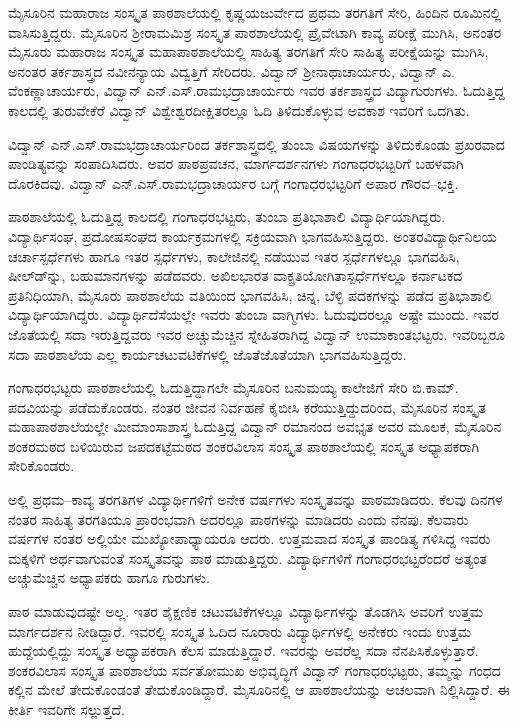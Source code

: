 {ಮೈಸೂರಿನ ಮಹಾರಾಜ ಸಂಸ್ಕೃತ ಪಾಠಶಾಲೆಯಲ್ಲಿ ಕೃಷ್ಣಯಜುರ್ವೇದ ಪ್ರಥಮ ತರಗತಿಗೆ ಸೇರಿ, ಹಿಂದಿನ ರೂಮಿನಲ್ಲಿ ವಾಸಿಸುತ್ತಿದ್ದರು. ಮೈಸೂರಿನ ಶ್ರೀರಾಮಮಿಶ್ರ ಸಂಸ್ಕೃತ ಪಾಠಶಾಲೆಯಲ್ಲಿ ಪ್ರೈವೇಟಾಗಿ ಕಾವ್ಯ ಪರೀಕ್ಷೆ ಮುಗಿಸಿ, ಅನಂತರ ಮೈಸೂರು ಮಹಾರಾಜ ಸಂಸ್ಕೃತ ಮಹಾಪಾಠಶಾಲೆಯಲ್ಲಿ ಸಾಹಿತ್ಯ ತರಗತಿಗೆ ಸೇರಿ ಸಾಹಿತ್ಯ ಪರೀಕ್ಷೆಯನ್ನು ಮುಗಿಸಿ, ಅನಂತರ ತರ್ಕಶಾಸ್ತ್ರದ ನವೀನನ್ಯಾಯ ವಿದ್ವತ್ತಿಗೆ ಸೇರಿದರು. ವಿದ್ವಾನ್ ಶ್ರೀನಾಥಾಚಾರ್ಯರು, ವಿದ್ವಾನ್ ಎ. ವೆಂಕಣ್ಣಾಚಾರ್ಯರು, ವಿದ್ವಾನ್ ಎನ್.ಎಸ್.ರಾಮಭದ್ರಾಚಾರ್ಯರು ಇವರ ತರ್ಕಶಾಸ್ತ್ರದ ವಿದ್ಯಾಗುರುಗಳು. ಓದುತ್ತಿದ್ದ ಕಾಲದಲ್ಲಿ ತುರುವೇಕೆರೆ ವಿದ್ವಾನ್ ವಿಶ್ವೇಶ್ವರದೀಕ್ಷಿತರಲ್ಲೂ ಓದಿ ತಿಳಿದುಕೊಳ್ಳುವ ಅವಕಾಶ ಇವರಿಗೆ ಒದಗಿತು. 

ವಿದ್ವಾನ್ ಎನ್.ಎಸ್.ರಾಮಭದ್ರಾಚಾರ್ಯರಿಂದ ತರ್ಕಶಾಸ್ತ್ರದಲ್ಲಿ ತುಂಬಾ ವಿಷಯಗಳನ್ನು ತಿಳಿದುಕೊಂಡು ಪ್ರಖರವಾದ ಪಾಂಡಿತ್ಯವನ್ನು ಸಂಪಾದಿಸಿದರು. ಅವರ ಪಾಠಪ್ರವಚನ, ಮಾರ್ಗದರ್ಶನಗಳು ಗಂಗಾಧರಭಟ್ಟರಿಗೆ ಬಹಳವಾಗಿ ದೊರಕಿದವು. ವಿದ್ವಾನ್ ಎನ್.ಎಸ್.ರಾಮಭದ್ರಾಚಾರ್ಯರ ಬಗ್ಗೆ ಗಂಗಾಧರಭಟ್ಟರಿಗೆ ಅಪಾರ ಗೌರವ–ಭಕ್ತಿ.

ಪಾಠಶಾಲೆಯಲ್ಲಿ ಓದುತ್ತಿದ್ದ ಕಾಲದಲ್ಲಿ ಗಂಗಾಧರಭಟ್ಟರು, ತುಂಬಾ ಪ್ರತಿಭಾಶಾಲಿ ವಿದ್ಯಾರ್ಥಿಯಾಗಿದ್ದರು. ವಿದ್ಯಾರ್ಥಿಸಂಘ, ಪ್ರದೋಷಸಂಘದ ಕಾರ್ಯಕ್ರಮಗಳಲ್ಲಿ ಸಕ್ರಿಯವಾಗಿ ಭಾಗವಹಿಸುತ್ತಿದ್ದರು. ಅಂತರವಿದ್ಯಾರ್ಥಿನಿಲಯ ಚರ್ಚಾಸ್ಪರ್ಧೆಗಳು ಹಾಗೂ ಇತರ ಸ್ಪರ್ಧೆಗಳು, ಕಾಲೇಜಿನಲ್ಲಿ ನಡೆಯುವ ಇತರ ಸ್ಪರ್ಧೆಗಳಲ್ಲೂ ಭಾಗವಹಿಸಿ, ಷೀಲ್ಡ್‍ನ್ನು, ಬಹುಮಾನಗಳನ್ನು ಪಡೆದವರು. ಅಖಿಲಭಾರತ ವಾಕ್ಪ್ರತಿಯೋಗಿತಾಸ್ಪರ್ಧೆಗಳಲ್ಲೂ ಕರ್ನಾಟಕದ ಪ್ರತಿನಿಧಿಯಾಗಿ, ಮೈಸೂರು ಪಾಠಶಾಲೆಯ ವತಿಯಿಂದ ಭಾಗವಹಿಸಿ, ಚಿನ್ನ, ಬೆಳ್ಳಿ ಪದಕಗಳನ್ನು ಪಡೆದ ಪ್ರತಿಭಾಶಾಲಿ ವಿದ್ಯಾರ್ಥಿಯಾಗಿದ್ದರು. ವಿದ್ಯಾರ್ಥಿದೆಸೆಯಲ್ಲೇ ಇವರು ತುಂಬಾ ವಾಗ್ಮಿಗಳು. ಓದುವುದರಲ್ಲೂ ಅಷ್ಟೇ ಮುಂದು. ಇವರ ಜೊತೆಯಲ್ಲಿ ಸದಾ ಇರುತ್ತಿದ್ದವರು ಇವರ ಅಚ್ಚುಮೆಚ್ಚಿನ ಸ್ನೇಹಿತರಾಗಿದ್ದ ವಿದ್ವಾನ್ ಉಮಾಕಾಂತಭಟ್ಟರು. ಇವರಿಬ್ಬರೂ ಸದಾ ಪಾಠಶಾಲೆಯ ಎಲ್ಲ ಕಾರ್ಯಚಟುವಟಿಕೆಗಳಲ್ಲಿ ಜೊತೆಜೊತೆಯಾಗಿ ಭಾಗವಹಿಸುತ್ತಿದ್ದರು.

ಗಂಗಾಧರಭಟ್ಟರು ಪಾಠಶಾಲೆಯಲ್ಲಿ ಓದುತ್ತಿದ್ದಾಗಲೇ ಮೈಸೂರಿನ ಬನುಮಯ್ಯ ಕಾಲೇಜಿಗೆ ಸೇರಿ ಬಿ.ಕಾಮ್. ಪದವಿಯನ್ನು ಪಡೆದುಕೊಂಡರು. ನಂತರ ಜೀವನ ನಿರ್ವಹಣೆ ಕೈಬೀಸಿ ಕರೆಯುತ್ತಿದ್ದುದರಿಂದ, ಮೈಸೂರಿನ ಸಂಸ್ಕೃತ ಮಹಾಪಾಠಶಾಲೆಯಲ್ಲೇ ಮೀಮಾಂಸಾಶಾಸ್ತ್ರ ಓದುತ್ತಿದ್ದ ವಿದ್ವಾನ್ ರಮಾನಂದ ಅವಭೃತ ಅವರ ಮೂಲಕ, ಮೈಸೂರಿನ ಶಂಕರಮಠದ ಬಳಿಯಿರುವ ಜಪದಕಟ್ಟೆಮಠದ ಶಂಕರವಿಲಾಸ ಸಂಸ್ಕೃತ ಪಾಠಶಾಲೆಯಲ್ಲಿ ಸಂಸ್ಕೃತ ಅಧ್ಯಾಪಕರಾಗಿ ಸೇರಿಕೊಂಡರು.

ಅಲ್ಲಿ ಪ್ರಥಮ–ಕಾವ್ಯ ತರಗತಿಗಳ ವಿದ್ಯಾರ್ಥಿಗಳಿಗೆ ಅನೇಕ ವರ್ಷಗಳು ಸಂಸ್ಕೃತವನ್ನು ಪಾಠಮಾಡಿದರು. ಕೆಲವು ದಿನಗಳ ನಂತರ ಸಾಹಿತ್ಯ ತರಗತಿಯೂ ಪ್ರಾರಂಭವಾಗಿ ಅದರಲ್ಲೂ ಪಾಠಗಳನ್ನು ಮಾಡಿದರು ಎಂದು ನೆನಪು. ಕೆಲವಾರು ವರ್ಷಗಳ ನಂತರ ಅಲ್ಲಿಯೇ ಮುಖ್ಯೋಪಾಧ್ಯಾಯರೂ ಆದರು. ಉತ್ತಮವಾದ ಸಂಸ್ಕೃತ ಪಾಂಡಿತ್ಯ ಗಳಿಸಿದ್ದ ಇವರು ಮಕ್ಕಳಿಗೆ ಅರ್ಥವಾಗುವಂತೆ ಸಂಸ್ಕೃತವನ್ನು ಪಾಠ ಮಾಡುತ್ತಿದ್ದರು. ವಿದ್ಯಾರ್ಥಿಗಳಿಗೆ ಗಂಗಾಧರಭಟ್ಟರೆಂದರೆ ಅತ್ಯಂತ ಅಚ್ಚುಮೆಚ್ಚಿನ ಅಧ್ಯಾಪಕರು ಹಾಗೂ ಗುರುಗಳು. 

ಪಾಠ ಮಾಡುವುದಷ್ಟೇ ಅಲ್ಲ. ಇತರ ಶೈಕ್ಷಣಿಕ ಚಟುವಟಿಕೆಗಳಲ್ಲೂ ವಿದ್ಯಾರ್ಥಿಗಳನ್ನು ತೊಡಗಿಸಿ ಅವರಿಗೆ ಉತ್ತಮ ಮಾರ್ಗದರ್ಶನ ನೀಡಿದ್ದಾರೆ. ಇವರಲ್ಲಿ ಸಂಸ್ಕೃತ ಓದಿದ ನೂರಾರು ವಿದ್ಯಾರ್ಥಿಗಳಲ್ಲಿ ಅನೇಕರು ಇಂದು ಉತ್ತಮ ಹುದ್ದೆಯಲ್ಲಿದ್ದು ಸಂಸ್ಕೃತ ಅಧ್ಯಾಪಕರಾಗಿ ಕೆಲಸ ಮಾಡುತ್ತಿದ್ದಾರೆ. ಇವರನ್ನು ಅವರೆಲ್ಲ ಸದಾ ನೆನಪಿಸಿಕೊಳ್ಳುತ್ತಾರೆ. ಶಂಕರವಿಲಾಸ ಸಂಸ್ಕೃತ ಪಾಠಶಾಲೆಯ ಸರ್ವತೋಮುಖ ಅಭಿವೃದ್ಧಿಗೆ ವಿದ್ವಾನ್ ಗಂಗಾಧರಭಟ್ಟರು, ತಮ್ಮನ್ನು ಗಂಧದ ಕಲ್ಲಿನ ಮೇಲೆ ತೇದುಕೊಂಡಂತೆ ತೇದುಕೊಂಡಿದ್ದಾರೆ. ಮೈಸೂರಿನಲ್ಲಿ ಆ ಪಾಠಶಾಲೆಯನ್ನು ಅಚಲವಾಗಿ ನಿಲ್ಲಿಸಿದ್ದಾರೆ. ಈ ಕೀರ್ತಿ ಇವರಿಗೇ ಸಲ್ಲುತ್ತದೆ.

}
